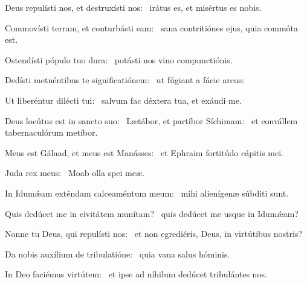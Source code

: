 \item Deus repulísti nos, et destruxísti nos:~\psstar{} irátus es, et misértus es nobis.

\item Commovísti terram, et conturbásti eam:~\psstar{} sana contritiónes ejus, quia commóta est.

\item Ostendísti pópulo tuo dura:~\psstar{} potásti nos vino compunctiónis.

\item Dedísti metuéntibus te significatiónem:~\psstar{} ut fúgiant a fácie arcus:

\item Ut liberéntur dilécti tui:~\psstar{} salvum fac déxtera tua, et exáudi me.

\item Deus locútus est in sancto suo:~\pscross{} Lætábor, et partíbor Síchimam:~\psstar{} et convállem tabernaculórum metíbor.

\item Meus est Gálaad, et meus est Manásses:~\psstar{} et Ephraim fortitúdo cápitis mei.

\item Juda rex meus:~\psstar{} Moab olla spei meæ.

\item In Idumǽam exténdam calceaméntum meum:~\psstar{} mihi alienígenæ súbditi sunt.

\item Quis dedúcet me in civitátem munítam?~\psstar{} quis dedúcet me usque in Idumǽam?

\item Nonne tu Deus, qui repulísti nos:~\psstar{} et non egrediéris, Deus, in virtútibus nostris?

\item Da nobis auxílium de tribulatióne:~\psstar{} quia vana salus hóminis.

\item In Deo faciémus virtútem:~\psstar{} et ipse ad níhilum dedúcet tribulántes nos.